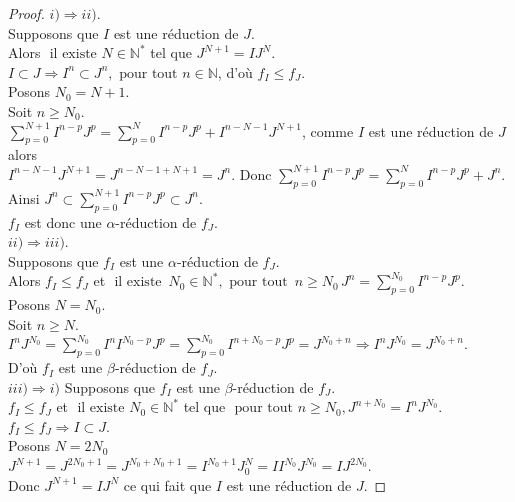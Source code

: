 \begin{proof}
	$i) \Rightarrow ii)$.\\
	Supposons que $I$ est une réduction de $J$.\\
	Alors $\text{ il existe } N \in \mathbb{N^*}$ tel que $J^{N+1} = IJ^N$.\\ $I \subset J \Rightarrow I^n \subset J^n , \text{ pour tout } n \in \mathbb{N}$, d'où $f_I \leq f_J$.\\
	Posons $N_0 = N+1$.\\
	Soit $n \geq N_0$.\\
	$\displaystyle \sum_{p=0}^{N+1}{I^{n-p} J^{p}} = \displaystyle \sum_{p=0}^{N}{I^{n-p} J^{p}} + I^{n-N-1} J^{N+1}$, comme $I$ est une réduction de $J$ alors\\ $I^{n-N-1} J^{N+1} = J^{n-N-1+N+1} = J^n$. Donc $\displaystyle \sum_{p=0}^{N+1}{I^{n-p} J^{p}} = \displaystyle \sum_{p=0}^{N}{I^{n-p} J^{p}} + J^{n}$.\\ Ainsi $J^n \subset \displaystyle \sum_{p=0}^{N+1}{I^{n-p} J^{p}} \subset J^n$.\\
	$f_I$ est donc une $\alpha$-réduction de $f_J$.\\
	$ii) \Rightarrow iii)$.\\
	Supposons que $f_I$ est une $\alpha$-réduction de $f_J$.\\
	Alors $f_I \leq f_J$ et $\text{ il existe } \, N_0 \in \mathbb{N^*} , \text{ pour tout } \, n \geq N_0 \, J^n = \displaystyle \sum_{p=0}^{N_0}{I^{n-p} J^{p}}$.\\
	Posons $N = N_0$.\\
	Soit $n \geq N$. \\
	$I^n J^{N_0} = \displaystyle \sum_{p=0}^{N_0}{I^n I^{N_0-p} J^{p}} = \displaystyle \sum_{p=0}^{N_0}{I^{n+N_0-p} J^{p}} = J^{N_0+n} \Rightarrow I^n J^{N_0} = J^{N_0+n}$.\\D'où $f_I$ est une $\beta$-réduction de $f_J$.\\
	$iii) \Rightarrow i)$
	Supposons que $f_I$ est une $\beta$-réduction de $f_J$.\\
	$f_I \leq f_J$ et $\text{ il existe } N_0 \in \mathbb{N^*}$ tel que $\text{ pour tout } n \geq N_0 , J^{n+N_0} = I^n J^{N_0}$.\\
	$f_I \leq f_J \Rightarrow I \subset J$.\\
	Posons $N = 2N_0$\\
	$J^{N+1} = J^{2N_0+1} = J^{N_0+N_0+1} = I^{N_0+1} J^N_0 = I I^{N_0} J^{N_0} = IJ^{2N_0}$.\\ Donc $J^{N+1}= IJ^{N}$ ce qui fait que $I$ est une réduction de $J$.
\end{proof}
